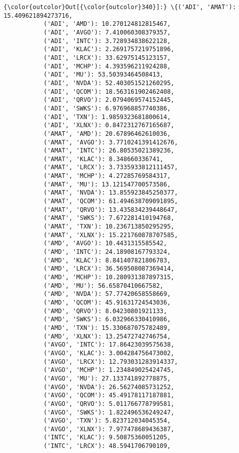 \documentclass[11pt]{article}
\begin{document}
\begin{Verbatim}[commandchars=\\\{\}]
{\color{outcolor}Out[{\color{outcolor}340}]:} \{('ADI', 'AMAT'): 15.409621894273716,
           ('ADI', 'AMD'): 10.270124812815467,
           ('ADI', 'AVGO'): 7.410060308379357,
           ('ADI', 'INTC'): 3.728934838622128,
           ('ADI', 'KLAC'): 2.2691757219751896,
           ('ADI', 'LRCX'): 33.62975145123157,
           ('ADI', 'MCHP'): 4.393596211924288,
           ('ADI', 'MU'): 53.50393464508413,
           ('ADI', 'NVDA'): 52.403051521260295,
           ('ADI', 'QCOM'): 18.563161902462408,
           ('ADI', 'QRVO'): 2.0794069574152445,
           ('ADI', 'SWKS'): 6.976968857740386,
           ('ADI', 'TXN'): 1.9859323681800614,
           ('ADI', 'XLNX'): 0.8472312767165687,
           ('AMAT', 'AMD'): 20.67896462610036,
           ('AMAT', 'AVGO'): 3.7710241391412676,
           ('AMAT', 'INTC'): 26.80535021389236,
           ('AMAT', 'KLAC'): 8.348660336741,
           ('AMAT', 'LRCX'): 3.7335933812111457,
           ('AMAT', 'MCHP'): 4.27285769584317,
           ('AMAT', 'MU'): 13.121547700573586,
           ('AMAT', 'NVDA'): 13.855923845250377,
           ('AMAT', 'QCOM'): 61.494638709091895,
           ('AMAT', 'QRVO'): 13.435834239448647,
           ('AMAT', 'SWKS'): 7.672281410194768,
           ('AMAT', 'TXN'): 10.236713850295295,
           ('AMAT', 'XLNX'): 15.221760878707585,
           ('AMD', 'AVGO'): 10.4431315585542,
           ('AMD', 'INTC'): 24.18908167793324,
           ('AMD', 'KLAC'): 8.841407821806783,
           ('AMD', 'LRCX'): 36.569508087369414,
           ('AMD', 'MCHP'): 10.280931387897315,
           ('AMD', 'MU'): 56.65870410667582,
           ('AMD', 'NVDA'): 57.77420658558669,
           ('AMD', 'QCOM'): 45.91631724543036,
           ('AMD', 'QRVO'): 8.04230801921133,
           ('AMD', 'SWKS'): 6.032966330410986,
           ('AMD', 'TXN'): 15.330687075782489,
           ('AMD', 'XLNX'): 13.25472742746754,
           ('AVGO', 'INTC'): 17.86423039575638,
           ('AVGO', 'KLAC'): 3.004284756473002,
           ('AVGO', 'LRCX'): 12.793031283914337,
           ('AVGO', 'MCHP'): 1.234849025424745,
           ('AVGO', 'MU'): 27.133741892778875,
           ('AVGO', 'NVDA'): 26.56274085731252,
           ('AVGO', 'QCOM'): 45.49178117187881,
           ('AVGO', 'QRVO'): 5.011766778799581,
           ('AVGO', 'SWKS'): 1.822496536249247,
           ('AVGO', 'TXN'): 5.823712034045354,
           ('AVGO', 'XLNX'): 7.977478689436387,
           ('INTC', 'KLAC'): 9.50875360051205,
           ('INTC', 'LRCX'): 48.5941706790109,

\end{Verbatim}
\end{document}

